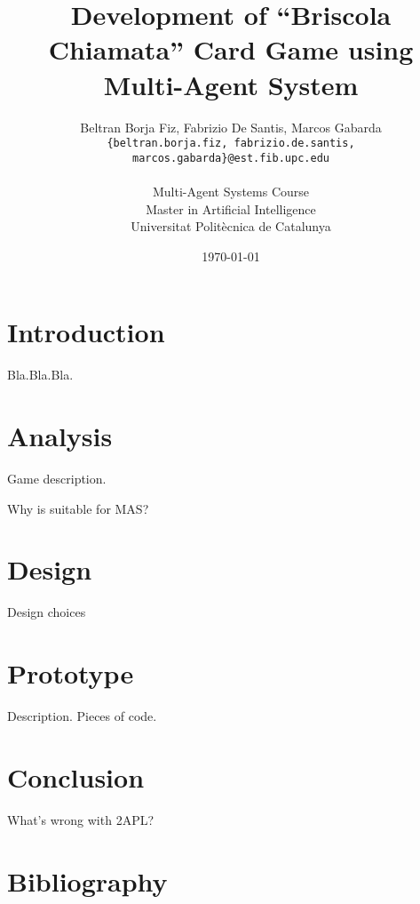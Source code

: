 \documentclass[a4paper]{article}
\begin{document}
\title{Development of ``Briscola Chiamata'' Card Game using Multi-Agent System}
 
\author{Beltran Borja Fiz, Fabrizio De Santis, Marcos Gabarda\\
\small \texttt{\{beltran.borja.fiz, fabrizio.de.santis, marcos.gabarda\}@est.fib.upc.edu}\\
\\
Multi-Agent Systems Course\\
Master in Artificial Intelligence\\
Universitat Polit\`ecnica de Catalunya}
\date{\today}

\newenvironment{fminipage}%
  {\begin{Sbox}\begin{minipage}}%
  {\end{minipage}\end{Sbox}\fbox{\TheSbox}}


\maketitle

\tableofcontents

\section{Introduction}\label{sec:intro}

Bla.Bla.Bla.

\section{Analysis}\label{sec:analysis} 

Game description.

Why is suitable for MAS?

\section{Design}\label{sec:design} 

Design choices

\section{Prototype}\label{sec:proto} 

Description. Pieces of code.

\section{Conclusion}\label{sec:concl} 

What's wrong with 2APL?

\section{Bibliography}
\nocite{*}


\end{document}
